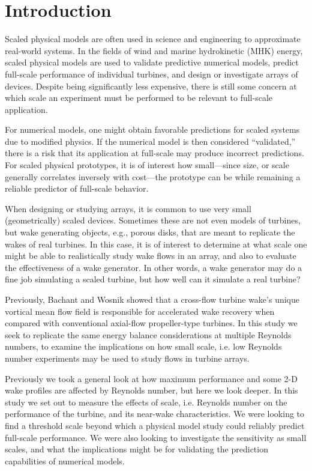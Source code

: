 \documentclass[energies,article,accept,moreauthors,pdftex,12pt,a4paper]{mdpi}
\begin{document}
\listoftodos

\section{Introduction}

Scaled physical models are often used in science and engineering to approximate
real-world systems. In the fields of wind and marine hydrokinetic (MHK) energy,
scaled physical models are used to validate predictive numerical models, predict
full-scale performance of individual turbines, and design or investigate arrays
of devices. Despite being significantly less expensive, there is still some
concern at which scale an experiment must be performed to be relevant to
full-scale application. 

For numerical models, one might obtain favorable predictions for scaled systems
due to modified physics. If the numerical model is then considered
``validated,'' there is a risk that its application at full-scale may produce
incorrect predictions. For scaled physical prototypes, it is of interest how
small---since size, or scale generally correlates inversely with cost---the
prototype can be while remaining a reliable predictor of full-scale behavior.

When designing or studying arrays, it is common to use very small
(geometrically) scaled devices. 
Sometimes these are not even models of turbines, but
wake generating objects, e.g., porous disks, that are meant to replicate the
wakes of real turbines. In this case, it is of interest to determine at what
scale one might be able to realistically study wake flows in an array, and also
to evaluate the effectiveness of a wake generator. In other words, a wake
generator may do a fine job simulating a scaled turbine, but how well can it
simulate a real turbine?

Previously, Bachant and Wosnik \cite{Bachant2015-JoT} showed that a cross-flow
turbine wake's unique vortical mean flow field is responsible for accelerated
wake recovery when compared with conventional axial-flow propeller-type
turbines. In this study we seek to replicate the same energy balance
considerations at multiple Reynolds numbers, to examine the implications on how
small scale, i.e. low Reynolds number experiments may be used to study flows in
turbine arrays.

Previously we took a general look at how maximum performance and some 2-D wake
profiles are affected by Reynolds number, but here we look deeper. In this study
we set out to measure the effects of scale, i.e. Reynolds number on the
performance of the turbine, and its near-wake characteristics. We were looking
to find a threshold scale beyond which a physical model study could reliably
predict full-scale performance. We were also looking to investigate the
sensitivity as small scales, and what the implications might be for validating
the prediction capabilities of numerical models.
\end{document}
